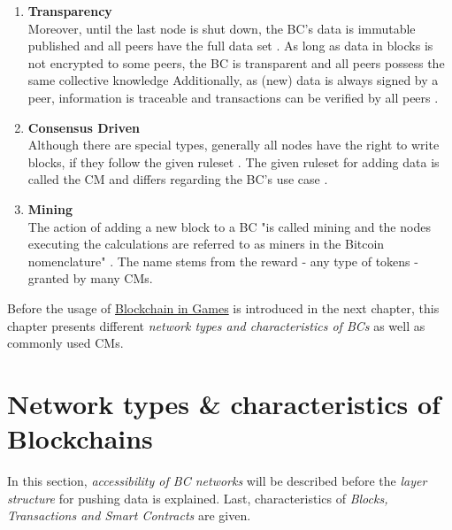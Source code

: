 \begin{enumerate}
	\item \textbf{Transparency} \\
	Moreover, until the last node is shut down, the \gls{BC}'s data is immutable published and all peers have the full data set \cite[88]{Sharma.2020}.
	As long as data in blocks is not encrypted to some peers, the BC is transparent and all peers possess the same collective knowledge \cite[483]{Gainsbury.2017}
	Additionally, as (new) data is always signed by a peer, information is traceable and transactions can be verified by all peers \cite[88]{Sharma.2020}.
	
	\item \textbf{Consensus Driven} \\
	Although there are special types, generally all nodes have the right to write blocks, if they follow the given ruleset \cite[54]{Dib.2018}.
	The given ruleset for adding data is called the \gls{CM} and differs regarding the \gls{BC}'s use case \cite[88]{Sharma.2020}.
	
	\item \textbf{Mining} \\
	The action of adding a new block to a \gls{BC} "is called mining
	and the nodes executing the calculations are referred to as miners in the Bitcoin nomenclature" \cite[4]{Butijn.2020}.
	The name stems from the reward - any type of tokens - granted by many \gls{CM}s.
	
\end{enumerate}
\noindent Before the usage of \hyperref[sec:BlockchainInGames]{Blockchain in Games} is introduced in the next chapter,
this chapter presents different \textit{network types and characteristics of \gls{BC}s} as well as commonly used \gls{CM}s.



\FloatBarrier

\section{Network types \& characteristics of Blockchains}
\label{sec:TypesOfBC}

In this section, \textit{accessibility of \gls{BC} networks} will be described before the \textit{layer structure} for pushing data is explained. 
Last, characteristics of \textit{Blocks, Transactions and Smart Contracts} are given.

